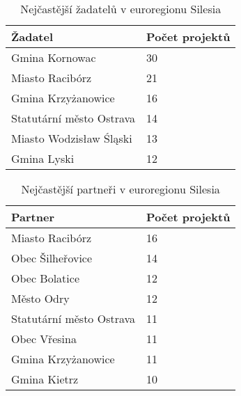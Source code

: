 \documentclass[a4paper,12pt,twoside,FP]{article}
\begin{document}
\bgroup
\begin{table}[H]
	\centering
	\renewcommand{\arraystretch}{1.25}%
	\begin{tabular}{|l|l|}
		\hline
		\textbf{Žadatel} & \textbf{Počet projektů} \\
		\hline
		Gmina Kornowac & 30 \\
		\hline
		Miasto Racibórz & 21 \\
		\hline
		Gmina Krzyżanowice & 16 \\
		\hline
		Statutární město Ostrava & 14 \\
		\hline
		Miasto Wodzisław Śląski & 13 \\
		\hline
		Gmina Lyski & 12 \\
		\hline
	\end{tabular}
	
	\caption{Nejčastější žadatelů v euroregionu Silesia}
\end{table}
\egroup

\bgroup
\begin{table}[H]
	\centering
	\renewcommand{\arraystretch}{1.25}%
	\begin{tabular}{|l|l|}
		\hline
		\textbf{Partner} & \textbf{Počet projektů} \\
		\hline
		Miasto Racibórz & 16 \\
		\hline
		Obec Šilheřovice & 14 \\
		\hline
		Obec Bolatice & 12 \\
		\hline
		Město Odry & 12 \\
		\hline
		Statutární město Ostrava & 11 \\
		\hline
		Obec Vřesina & 11 \\
		\hline
		Gmina Krzyżanowice & 11 \\
		\hline
		Gmina Kietrz & 10 \\
		\hline
	\end{tabular}
	
	\caption{Nejčastější partneři v euroregionu Silesia}
\end{table}
\egroup
\end{document}
